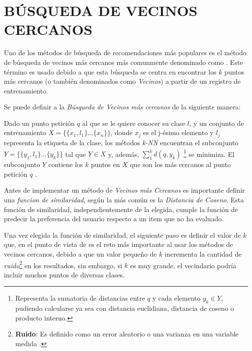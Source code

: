 \section{BÚSQUEDA DE VECINOS CERCANOS}

Uno de los métodos de búsqueda de recomendaciones más populares es el método de búsqueda de vecinos más cercanos más comunmente denominado como . Este término es usado debido a que esta búsqueda se centra en encontrar los $k$ puntos más cercanos (o también denominados como \textit{Vecinos}) a partir de un registro de entrenamiento\parencite{10.5555/1941884}.

Se puede definir a la \textit{Búsqueda de Vecinos más cercanos} de la siguiente manera: 


\begin{definition}
    Dado un punto petición $q$ al que se le quiere conocer su clase $l$, y un conjunto de entrenamiento $X = \{ \{x_1, l_1\}\hdots\{x_n\} \}$, donde $x_j$ es el j-ésimo elemento y $l_j$ representa la etiqueta de la clase, los métodos \textit{k-NN} encuentran el subconjunto $Y = \{\{y_1, l_1\} \hdots \{y_k\} \}$ tal que $Y \in X$ y, además, $\sum^k_1d(q, y_k)$ \footnote{Representa la sumatoria de distancias entre $q$ y cada elemento $y_k \in Y$, pudiendo calcularse ya sea con distancia euclidiana, distancia de coseno o producto interno.}  se minimiza. El subconjunto $Y$ contiene los $k$ puntos en $X$ que son los más cercanos al punto petición $q$ \parencite{10.5555/1941884}.  
\end{definition}

Antes de implementar un método de \textit{Vecinos más Cercanos} es importante definir una \textit{funcion de similaridad}, según \parencite{Aggarwal2016} la más común es la \textit{Distancia de Coseno}.  Esta función de similaridad, independientemente de la elegida, cumple la función de predecir la preferencia del usuario respecto a un item que no ha evaluado. 

Una vez elegida la función de similaridad, el siguiente paso es definir el valor de $k$ que, en el punto de vista de \parencite{10.5555/1941884} es el reto más importante al usar los métodos de vecinos cercanos, debido a que un valor pequeño de $k$ incrementa la cantidad de \textit{ruido}\footnote{\textbf{Ruido}: Es definido como un error aleatorio o una varianza en una variable medida \parencite{alasadi2017review}. } en los resultados, sin embargo, si $k$ es muy grande, el vecindario podría incluir muchos puntos de diversas clases.

